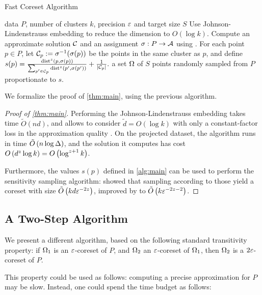 \begin{algorithm}[tb]
   \caption{Fast Coreset Algorithm}
   \label{alg:main}
\begin{algorithmic}
    data $P$, number of clusters $k$, precision $\varepsilon$ and target size $S$
   \STATE Use Johnson-Lindenstrauss embedding to reduce the dimension to $O(\log k)$.
   \STATE Compute an approximate solution $\mathcal C$ and an assignment $\sigma : P \rightarrow \mathcal A$ using \fkmeans.
   \STATE For each point $p \in P$, let $\mathcal C_p := \sigma^{-1}(\sigma(p))$ be the points in the same cluster as $p$, and define 
   $s(p) = \frac{\operatorname{dist}^z(p, \sigma(p))}{\sum_{p' \in \mathcal C_p} \operatorname{dist}^z(p', \sigma(p'))} + \frac{1}{|\mathcal C_p|}.$
    a set $\Omega$ of $S$ points randomly sampled from $P$ proportionate to $s$.
\end{algorithmic}
\end{algorithm}


We formalize the proof of \cref{thm:main}, using the previous algorithm.

\begin{proof}[Proof of \cref{thm:main}]
Performing the Johnson-Lindenstrauss embedding takes time $\tilde O(nd)$, and allows to consider $\tilde d=O(\log k)$ with only a constant-factor loss in the approximation quality  \cite{makarychev2019performance}. 
On the projected dataset, the algorithm \fkmeans runs in time $\tilde O\left( n \log \Delta\right)$, and the solution it computes has cost $O\left( d^z \log k\right) = O\left(\log^{z+1} k\right)$. 

Furthermore, the values $s(p)$ defined in \cref{alg:main} can be used to perform the sensitivity sampling algorithm: \cite{FeldmanL11} showed that sampling according to those yield a coreset with size $\tilde O \left( k d \varepsilon^{-2z}\right)$, improved by \cite{HuangV20} to $\tilde O \left( k \varepsilon^{-2z -2} \right)$.
\end{proof}



\subsection{A Two-Step Algorithm}
We present a different algorithm, based on the following standard transitivity property: if $\Omega_1$ is an $\varepsilon$-coreset of $P$, and $\Omega_2$ an $\varepsilon$-coreset of $\Omega_1$, then $\Omega_2$ is a $2\varepsilon$-coreset of $P$.

This property could be used as follows: computing a precise approximation for $P$ may be slow. Instead, one could spend the time budget as follows:

